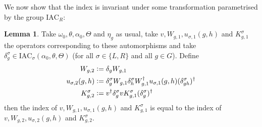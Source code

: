 \documentclass[12pt,a4paper,twoside]{article}
\newcommand{\defeq}{\vcentcolon=}
\theoremstyle{definition}
\newtheorem{lemma}[theorem]{Lemma}
\numberwithin{equation}{section}
\begin{document}
We now show that the index is invariant under some transformation parametrised by the group $\textrm{IAC}_R$:
\begin{lemma}\label{lem:TransformationUnderDelta}
	Take $\omega_0,\theta,\alpha_0,\Theta$ and $\eta_g$ as usual, take $v,W_{g,1},u_{\sigma,1}(g,h)$ and $K_{g,1}^\sigma$ the operators corresponding to these automorphisms and take $\delta^\sigma_g\in\textrm{IAC}_\sigma(\alpha_0,\theta,\Theta)$ (for all $\sigma\in\{L,R\}$ and all $g\in G$). Define
	\begin{align}
		W_{g,2}&\defeq\delta_g W_{g,1}\\
		u_{\sigma,2}(g,h)&\defeq \delta_g^\sigma W_{g,1}\delta_h^\sigma W_{g,1}^\dagger u_{\sigma,1}(g,h)(\delta_{gh}^\sigma)^\dagger\\
		K^\sigma_{g,2}&\defeq v^\dagger \delta_g^\sigma v K_{g,1}^\sigma (\delta_g^\sigma)^\dagger
	\end{align}
	then the index of $v,W_{g,1},u_{\sigma,1}(g,h)$ and $K_{g,1}^\sigma$ is equal to the index of $v,W_{g,2},u_{\sigma,2}(g,h)$ and $K_{g,2}^\sigma$.
\end{lemma}
\end{document}
